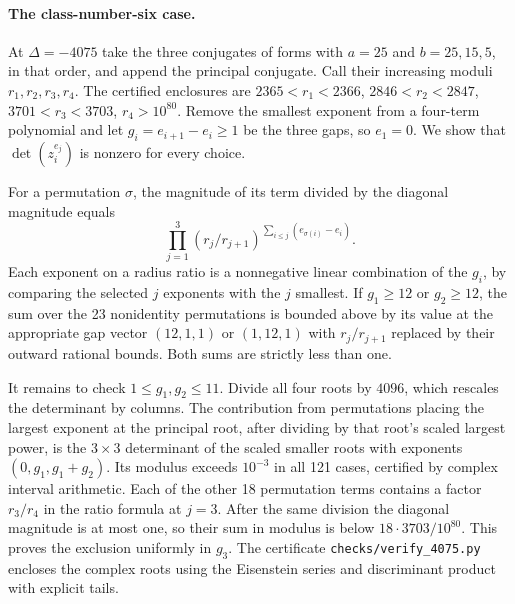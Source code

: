 \paragraph{The class-number-six case.}
At $\Delta=-4075$ take the three conjugates of forms with $a=25$ and
$b=25,15,5$, in that order, and append the principal conjugate. Call their increasing moduli $r_1,r_2,r_3,r_4$.
The certified enclosures are $2365<r_1<2366$, $2846<r_2<2847$,
$3701<r_3<3703$, $r_4>10^{80}$. Remove the smallest exponent from
a four-term polynomial and let $g_i=e_{i+1}-e_i\ge1$ be the three gaps,
so $e_1=0$. We show that $\det(z_i^{e_j})$ is nonzero for every choice.

For a permutation $\sigma$, the magnitude of its term divided by the
diagonal magnitude equals
\[
 \prod_{j=1}^3(r_j/r_{j+1})^{\sum_{i\le j}(e_{\sigma(i)}-e_i)} .
\]
Each exponent on a radius ratio is a nonnegative linear combination of
the $g_i$, by comparing the selected $j$ exponents with the $j$ smallest.
If $g_1\ge12$ or $g_2\ge12$, the sum over the 23 nonidentity permutations
is bounded above by its value at the appropriate gap vector $(12,1,1)$ or
$(1,12,1)$ with $r_j/r_{j+1}$ replaced by their outward rational bounds.
Both sums are strictly less than one.

It remains to check $1\le g_1,g_2\le11$. Divide all four roots by $4096$,
which rescales the determinant by columns. The contribution from
permutations placing the largest exponent at the principal root, after
dividing by that root's scaled largest power, is the $3\times3$ determinant
of the scaled smaller roots with exponents $(0,g_1,g_1+g_2)$. Its modulus
exceeds $10^{-3}$ in all 121 cases, certified by complex interval
arithmetic. Each of the other 18 permutation terms contains a factor
$r_3/r_4$ in the ratio formula at $j=3$. After the same division the
diagonal magnitude is at most one, so their sum in modulus is below
$18\cdot3703/10^{80}$. This proves the exclusion uniformly in $g_3$.
The certificate \texttt{checks/verify\_4075.py} encloses the complex roots
using the Eisenstein series and discriminant product with explicit tails.
